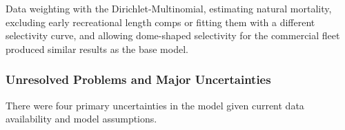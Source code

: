 \documentclass[11pt,
  english,
  a4paper,
]{article}
\begin{document}
\leavevmode\tagmcend\tagstructend\par


Data weighting with the Dirichlet-Multinomial, estimating natural mortality, excluding early recreational length comps or fitting them with a different selectivity curve, and allowing dome-shaped selectivity for the commercial fleet produced similar results as the base model.

\leavevmode\tagmcend\tagstructend\par


\hypertarget{unresolved-problems-and-major-uncertainties}{%
\subsubsection{Unresolved Problems and Major Uncertainties}\label{unresolved-problems-and-major-uncertainties}}

\leavevmode\tagmcend\tagstructend

There were four primary uncertainties in the model given current data availability and model assumptions.
\end{document}
